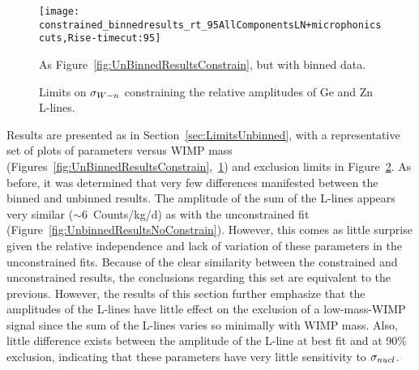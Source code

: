 			\begin{figure}
				\centering				
				\texttt{[image: constrained\_binnedresults\_rt\_95AllComponentsLN+microphonicscuts,Rise-timecut:95]}
								
				\caption[Binned fit results, constraints on relative amplitude of Ge and Zn lines]
				{As Figure~\ref{fig:UnBinnedResultsConstrain}, but with binned data.}
				\label{fig:BinnedResultsConstrain}
			\end{figure}
			
			\begin{sidewaysfigure}
				\centering
				\caption[Limits on $\sigman$ constraining the relative amplitudes of Ge and Zn L-lines]
				{Limits on $\sigman$ constraining the relative amplitudes of Ge and Zn L-lines.}
				\label{fig:ConstrainedLimits}
			\end{sidewaysfigure}		
			
Results are presented as in Section~\ref{sec:LimitsUnbinned}, with a representative set of plots of parameters versus WIMP mass (Figures~\ref{fig:UnBinnedResultsConstrain},~\ref{fig:BinnedResultsConstrain}) and exclusion limits in Figure~\ref{fig:ConstrainedLimits}.  As before, it was determined that very few differences manifested between the binned and unbinned results.  The amplitude of the sum of the L-lines appears very similar ($\sim6$~Counts/kg/d) as with the unconstrained fit (Figure~\ref{fig:UnbinnedResultsNoConstrain}).  However, this comes as little surprise given the relative independence and lack of variation of these parameters in the unconstrained fits.  Because of the clear similarity between the constrained and unconstrained results, the conclusions regarding this set are equivalent to the previous.  However, the results of this section further emphasize that the amplitudes of the L-lines have little effect on the exclusion of a low-mass-WIMP signal since the sum of the L-lines varies so minimally with WIMP mass.  Also, little difference exists between the amplitude of the L-line at best fit and at 90\% exclusion, indicating that these parameters have very little sensitivity to $\sigma_{nucl}$.

